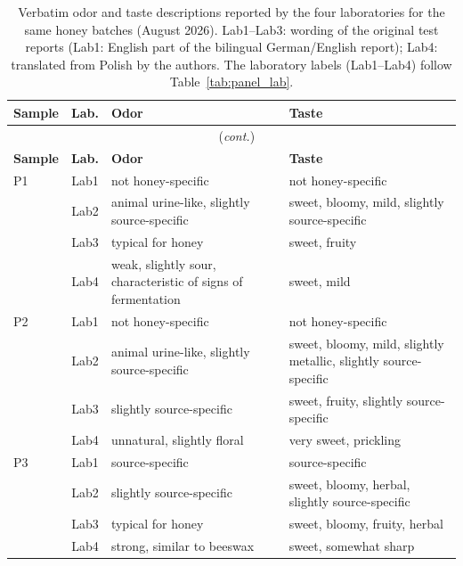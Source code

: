 {\small
\begin{longtable}{@{}lc>{\raggedright\arraybackslash}p{5.2cm}>{\raggedright\arraybackslash}p{5.6cm}@{}}
\caption{Verbatim odor and taste descriptions reported by the four laboratories
for the same honey batches (August 2026). Lab1--Lab3: wording of the original
test reports (Lab1: English part of the bilingual German/English report); Lab4:
translated from Polish by the authors. The laboratory labels (Lab1--Lab4)
follow Table~\ref{tab:panel_lab}.\label{tab:interlab_descriptions}}\\
\toprule
\textbf{Sample} & \textbf{Lab.} & \textbf{Odor} & \textbf{Taste} \\
\midrule
\endfirsthead
\multicolumn{4}{c}{\tablename\ \thetable{} (\textit{cont.})}\\
\toprule
\textbf{Sample} & \textbf{Lab.} & \textbf{Odor} & \textbf{Taste} \\
\midrule
\endhead
\bottomrule
\endfoot
P1
 & Lab1 & not honey-specific & not honey-specific \\
 & Lab2 & animal urine-like, slightly source-specific & sweet, bloomy, mild, slightly source-specific \\
 & Lab3 & typical for honey & sweet, fruity \\
 & Lab4 & weak, slightly sour, characteristic of signs of fermentation & sweet, mild \\
\midrule
P2
 & Lab1 & not honey-specific & not honey-specific \\
 & Lab2 & animal urine-like, slightly source-specific & sweet, bloomy, mild, slightly metallic, slightly source-specific \\
 & Lab3 & slightly source-specific & sweet, fruity, slightly source-specific \\
 & Lab4 & unnatural, slightly floral & very sweet, prickling \\
\midrule
P3
 & Lab1 & source-specific & source-specific \\
 & Lab2 & slightly source-specific & sweet, bloomy, herbal, slightly source-specific \\
 & Lab3 & typical for honey & sweet, bloomy, fruity, herbal \\
 & Lab4 & strong, similar to beeswax & sweet, somewhat sharp \\

\end{longtable}}
